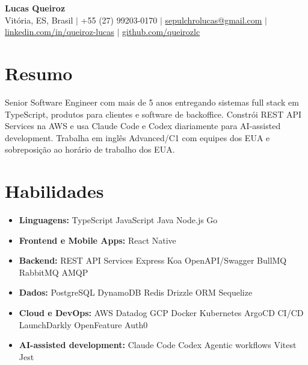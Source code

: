 \documentclass[letterpaper,10pt]{article}
\newcommand{\resumeItem}[1]{\item\small{#1}}
\newcommand{\resumeSubHeadingList}{\begin{itemize}[leftmargin=0.15in, label={}, nosep]}
\newcommand{\resumeSubHeadingListEnd}{\end{itemize}}
\begin{document}
\begin{center}
  \textbf{\Huge Lucas Queiroz} \\[3pt]
  \small Vit\'oria, ES, Brasil $|$ +55 (27) 99203-0170 $|$ \href{mailto:sepulchrolucas@gmail.com}{sepulchrolucas@gmail.com} $|$
  \href{https://linkedin.com/in/queiroz-lucas}{linkedin.com/in/queiroz-lucas} $|$
  \href{https://github.com/queirozlc}{github.com/queirozlc}
\end{center}
\vspace{2pt}

\section{Resumo}
Senior Software Engineer com mais de 5 anos entregando sistemas full stack em TypeScript, produtos para clientes e software de backoffice. Constr\'oi REST API Services na AWS e usa Claude Code e Codex diariamente para AI-assisted development. Trabalha em ingl\^es Advanced/C1 com equipes dos EUA e sobreposi\c{c}\~ao ao hor\'ario de trabalho dos EUA.

\section{Habilidades}
\resumeSubHeadingList
\resumeItem{\textbf{Linguagens:} TypeScript \textbar{} JavaScript \textbar{} Java \textbar{} Node.js \textbar{} Go}
\resumeItem{\textbf{Frontend e Mobile Apps:} React Native}
\resumeItem{\textbf{Backend:} REST API Services \textbar{} Express \textbar{} Koa \textbar{} OpenAPI/Swagger \textbar{} BullMQ \textbar{} RabbitMQ \textbar{} AMQP}
\resumeItem{\textbf{Dados:} PostgreSQL \textbar{} DynamoDB \textbar{} Redis \textbar{} Drizzle ORM \textbar{} Sequelize}
\resumeItem{\textbf{Cloud e DevOps:} AWS \textbar{} Datadog \textbar{} GCP \textbar{} Docker \textbar{} Kubernetes \textbar{} ArgoCD \textbar{} CI/CD \textbar{} LaunchDarkly \textbar{} OpenFeature \textbar{} Auth0}
\resumeItem{\textbf{AI-assisted development:} Claude Code \textbar{} Codex \textbar{} Agentic workflows \textbar{} Vitest \textbar{} Jest}
\resumeSubHeadingListEnd
\end{document}
